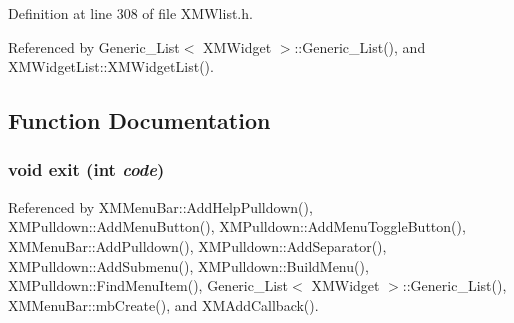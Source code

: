 Definition at line 308 of file XMWlist.h.

Referenced by Generic\_\-List$<$ XMWidget $>$::Generic\_\-List(), and XMWidget\-List::XMWidget\-List().

\subsection{Function Documentation}
\subsubsection{\setlength{\rightskip}{0pt plus 5cm}void exit (int {\em code})}\label{XMWlist_8h_a1}




Referenced by XMMenu\-Bar::Add\-Help\-Pulldown(), XMPulldown::Add\-Menu\-Button(), XMPulldown::Add\-Menu\-Toggle\-Button(), XMMenu\-Bar::Add\-Pulldown(), XMPulldown::Add\-Separator(), XMPulldown::Add\-Submenu(), XMPulldown::Build\-Menu(), XMPulldown::Find\-Menu\-Item(), Generic\_\-List$<$ XMWidget $>$::Generic\_\-List(), XMMenu\-Bar::mb\-Create(), and XMAdd\-Callback().